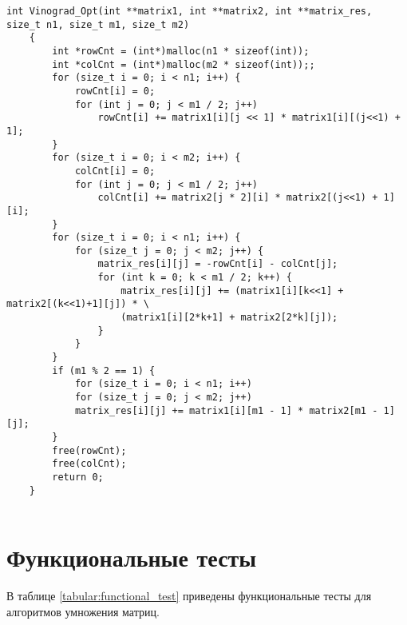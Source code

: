 \begin{lstlisting}[label=lst:dlev_mat,caption= Оптимизированный Алгоритм Винограда]
	int Vinograd_Opt(int **matrix1, int **matrix2, int **matrix_res, size_t n1, size_t m1, size_t m2)
	{
		int *rowCnt = (int*)malloc(n1 * sizeof(int));
		int *colCnt = (int*)malloc(m2 * sizeof(int));;
		for (size_t i = 0; i < n1; i++) {
			rowCnt[i] = 0;
			for (int j = 0; j < m1 / 2; j++)
				rowCnt[i] += matrix1[i][j << 1] * matrix1[i][(j<<1) + 1];
		}
		for (size_t i = 0; i < m2; i++) {
			colCnt[i] = 0;
			for (int j = 0; j < m1 / 2; j++)
				colCnt[i] += matrix2[j * 2][i] * matrix2[(j<<1) + 1][i];
		}
		for (size_t i = 0; i < n1; i++) {
			for (size_t j = 0; j < m2; j++) {
				matrix_res[i][j] = -rowCnt[i] - colCnt[j];
				for (int k = 0; k < m1 / 2; k++) {
					matrix_res[i][j] += (matrix1[i][k<<1] + matrix2[(k<<1)+1][j]) * \
					(matrix1[i][2*k+1] + matrix2[2*k][j]);
				}
			}
		}
		if (m1 % 2 == 1) {
			for (size_t i = 0; i < n1; i++)
			for (size_t j = 0; j < m2; j++)
			matrix_res[i][j] += matrix1[i][m1 - 1] * matrix2[m1 - 1][j];
		}
		free(rowCnt);
		free(colCnt);
		return 0;
	}
	
\end{lstlisting}
\newpage

\section{Функциональные тесты}
В таблице \ref{tabular:functional_test} приведены функциональные тесты для алгоритмов умножения матриц.

